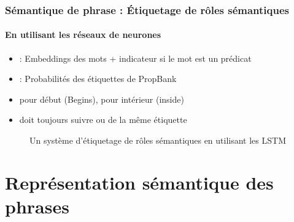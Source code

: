 \documentclass[xcolor=table]{beamer}
\begin{document}
\begin{frame}
	\frametitle{Sémantique de phrase : Étiquetage de rôles sémantiques}
	\framesubtitle{En utilisant les réseaux de neurones}

	\begin{minipage}{.48\textwidth}
		\begin{itemize}
			\item {} : Embeddings des mots + indicateur si le mot est un prédicat 
			\item {} : Probabilités des étiquettes de PropBank 
			\item {} pour début (Begins),  pour intérieur (inside)
			\item {} doit toujours suivre  ou  de la même étiquette
		\end{itemize}
	\end{minipage}
	\begin{minipage}{.5\textwidth}
		\begin{figure}
			\caption{Un système d'étiquetage de rôles sémantiques en utilisant les LSTM \cite{2017-he-al}}
		\end{figure}
	\end{minipage}
	
\end{frame}

\section{Représentation sémantique des phrases}
\end{document}
